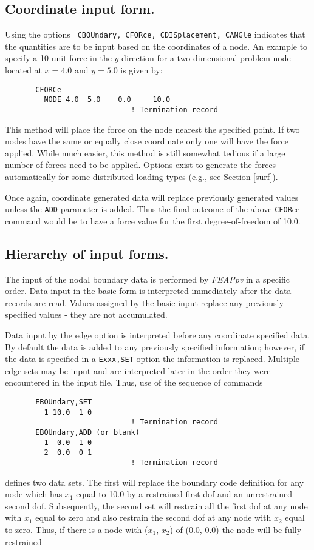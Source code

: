 \subsection{Coordinate input form.}

Using the options {\tt
CBOUndary, CFORce, CDISplacement, CANGle} indicates that the quantities
are to be input based on the coordinates of a node.
An example to specify a 10 unit force in the $y$-direction for a two-dimensional
problem node located at $x = 4.0$ and $y = 5.0$ is given by:
\begin{verbatim}
       CFORCe
         NODE 4.0  5.0    0.0     10.0
                             ! Termination record
\end{verbatim}
This method will place the force on the node nearest the specified point.
If two nodes have the same or equally close
coordinate only one will have the force applied.
While much easier, this method is still somewhat tedious if a large number of
forces need to be applied.  Options exist to generate the forces automatically
for some distributed loading types (e.g., see Section \ref{surf}).

Once again, coordinate generated data will replace previously generated values
unless the {\tt ADD} parameter is added.  Thus the final outcome of the above
{\tt CFOR}ce command would be to have a force value
for the first degree-of-freedom of 10.0.

\subsection{Hierarchy of input forms.}

The input of the nodal boundary data is performed by {\sl FEAPpv} in a specific
order.  Data input in the basic form is interpreted immediately after the
data records are read.  Values assigned by the basic input replace any
previously specified values - they are not accumulated.

Data input by the edge option is interpreted before any coordinate specified
data.  By default the data is added to any previously specified information;
however, if the data is specified in a {\tt Exxx,SET} option the information is
replaced.  Multiple edge sets may be input and are interpreted later in
the order they were encountered in the input file.  Thus, use of the sequence
of commands
\begin{verbatim}
       EBOUndary,SET
         1 10.0  1 0
                             ! Termination record
       EBOUndary,ADD (or blank)
         1  0.0  1 0
         2  0.0  0 1
                             ! Termination record
\end{verbatim}
defines two data sets.  The first will replace the boundary code definition
for any node which has $x_1$ equal to 10.0 by a restrained first dof and
an unrestrained second dof.  Subsequently, the second set will restrain
all the first dof at any node with $x_1$ equal to zero
and also restrain the second dof at any node with $x_2$ equal to zero. 
Thus, if there is a node with ($x_1$, $x_2$) of (0.0, 0.0) the node will
be fully restrained

